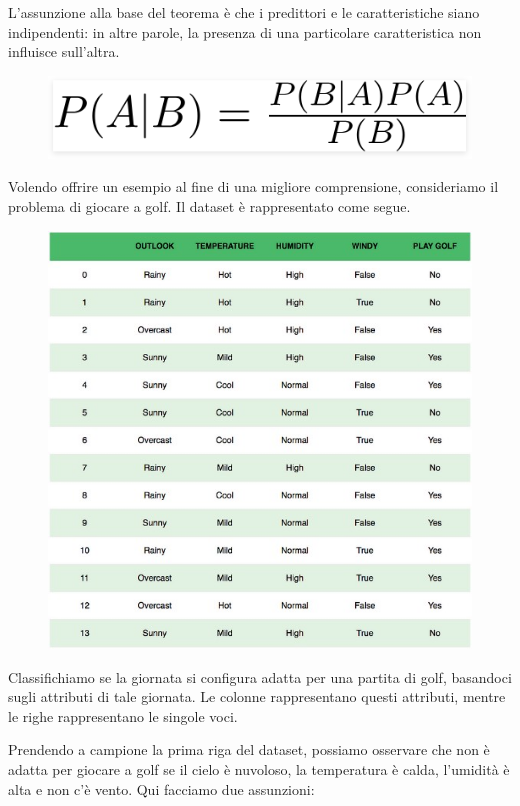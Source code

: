 L'assunzione alla base del teorema è che i predittori e le caratteristiche siano indipendenti: in altre parole, la presenza di una particolare caratteristica non influisce sull'altra.
\begin{figure}
    \begin{center}    
        \includegraphics[width=0.9\linewidth]{images/image17.png}
    \end{center}
\end{figure}
Volendo oﬀrire un esempio al fine di una migliore comprensione, consideriamo il problema di giocare a golf.  Il dataset è rappresentato come segue.
\begin{figure}
    \begin{center}    
        \includegraphics[width=0.9\linewidth]{images/image18.jpeg}
    \end{center}
\end{figure}
Classifichiamo se la giornata si configura adatta per una partita di golf, basandoci sugli attributi di tale giornata. Le colonne rappresentano questi attributi, mentre le righe rappresentano le singole voci.

Prendendo a campione la prima riga del dataset, possiamo osservare che non è adatta per giocare a golf se il cielo è nuvoloso, la temperatura è calda, l'umidità è alta e non c'è vento. Qui facciamo due assunzioni: 

